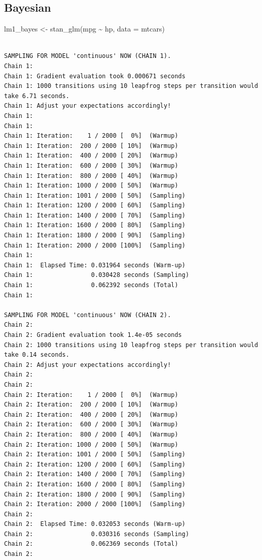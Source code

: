 \documentclass[
  letterpaper,
  DIV=11,
  numbers=noendperiod]{scrreprt}
\newenvironment{Shaded}{\begin{snugshade}}{\end{snugshade}}
\newcommand{\AttributeTok}[1]{\textcolor[rgb]{0.40,0.45,0.13}{#1}}
\newcommand{\FunctionTok}[1]{\textcolor[rgb]{0.28,0.35,0.67}{#1}}
\newcommand{\NormalTok}[1]{\textcolor[rgb]{0.00,0.23,0.31}{#1}}
\newcommand{\OtherTok}[1]{\textcolor[rgb]{0.00,0.23,0.31}{#1}}
\newcommand{\SpecialCharTok}[1]{\textcolor[rgb]{0.37,0.37,0.37}{#1}}
\theoremstyle{definition}
\theoremstyle{definition}
\theoremstyle{remark}
\begin{document}
\hypertarget{bayesian}{%
\subsection{Bayesian}\label{bayesian}}

\begin{Shaded}
\begin{Highlighting}[]
\NormalTok{lm1\_bayes }\OtherTok{\textless{}{-}} \FunctionTok{stan\_glm}\NormalTok{(mpg }\SpecialCharTok{\textasciitilde{}}\NormalTok{ hp, }\AttributeTok{data =}\NormalTok{ mtcars)}
\end{Highlighting}
\end{Shaded}

\begin{verbatim}

SAMPLING FOR MODEL 'continuous' NOW (CHAIN 1).
Chain 1: 
Chain 1: Gradient evaluation took 0.000671 seconds
Chain 1: 1000 transitions using 10 leapfrog steps per transition would take 6.71 seconds.
Chain 1: Adjust your expectations accordingly!
Chain 1: 
Chain 1: 
Chain 1: Iteration:    1 / 2000 [  0%]  (Warmup)
Chain 1: Iteration:  200 / 2000 [ 10%]  (Warmup)
Chain 1: Iteration:  400 / 2000 [ 20%]  (Warmup)
Chain 1: Iteration:  600 / 2000 [ 30%]  (Warmup)
Chain 1: Iteration:  800 / 2000 [ 40%]  (Warmup)
Chain 1: Iteration: 1000 / 2000 [ 50%]  (Warmup)
Chain 1: Iteration: 1001 / 2000 [ 50%]  (Sampling)
Chain 1: Iteration: 1200 / 2000 [ 60%]  (Sampling)
Chain 1: Iteration: 1400 / 2000 [ 70%]  (Sampling)
Chain 1: Iteration: 1600 / 2000 [ 80%]  (Sampling)
Chain 1: Iteration: 1800 / 2000 [ 90%]  (Sampling)
Chain 1: Iteration: 2000 / 2000 [100%]  (Sampling)
Chain 1: 
Chain 1:  Elapsed Time: 0.031964 seconds (Warm-up)
Chain 1:                0.030428 seconds (Sampling)
Chain 1:                0.062392 seconds (Total)
Chain 1: 

SAMPLING FOR MODEL 'continuous' NOW (CHAIN 2).
Chain 2: 
Chain 2: Gradient evaluation took 1.4e-05 seconds
Chain 2: 1000 transitions using 10 leapfrog steps per transition would take 0.14 seconds.
Chain 2: Adjust your expectations accordingly!
Chain 2: 
Chain 2: 
Chain 2: Iteration:    1 / 2000 [  0%]  (Warmup)
Chain 2: Iteration:  200 / 2000 [ 10%]  (Warmup)
Chain 2: Iteration:  400 / 2000 [ 20%]  (Warmup)
Chain 2: Iteration:  600 / 2000 [ 30%]  (Warmup)
Chain 2: Iteration:  800 / 2000 [ 40%]  (Warmup)
Chain 2: Iteration: 1000 / 2000 [ 50%]  (Warmup)
Chain 2: Iteration: 1001 / 2000 [ 50%]  (Sampling)
Chain 2: Iteration: 1200 / 2000 [ 60%]  (Sampling)
Chain 2: Iteration: 1400 / 2000 [ 70%]  (Sampling)
Chain 2: Iteration: 1600 / 2000 [ 80%]  (Sampling)
Chain 2: Iteration: 1800 / 2000 [ 90%]  (Sampling)
Chain 2: Iteration: 2000 / 2000 [100%]  (Sampling)
Chain 2: 
Chain 2:  Elapsed Time: 0.032053 seconds (Warm-up)
Chain 2:                0.030316 seconds (Sampling)
Chain 2:                0.062369 seconds (Total)
Chain 2: 


\end{verbatim}
\end{document}
